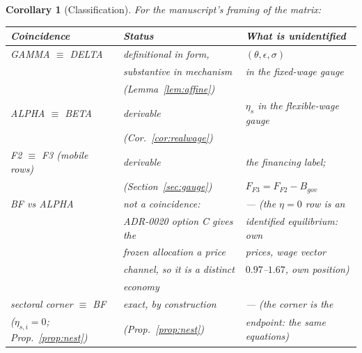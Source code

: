 \documentclass[11pt]{article}
\newtheorem{corollary}{Corollary}
\numberwithin{equation}{section}
\begin{document}
\begin{corollary}[Classification]\label{cor:class}
For the manuscript's framing of the matrix:

\begin{center}
\begin{tabular}{lll}
\toprule
Coincidence & Status & What is unidentified \\
\midrule
GAMMA $\equiv$ DELTA & definitional in form, & $(\theta,\epsilon,\sigma)$ \\
 & substantive in mechanism & in the fixed-wage gauge \\
 & (Lemma~\ref{lem:affine}) & \\
ALPHA $\equiv$ BETA & derivable & $\eta_s$ in the flexible-wage gauge \\
 & (Cor.~\ref{cor:realwage}) & \\
F2 $\equiv$ F3 (mobile rows) & derivable & the financing label; \\
 & (Section~\ref{sec:gauge}) & $F_{F3} = F_{F2} - B_{gov}$ \\
\textcolor{revisionV1}{BF vs ALPHA} & \textcolor{revisionV1}{not a coincidence:} & \textcolor{revisionV1}{--- (the $\eta=0$ row is an} \\
 & \textcolor{revisionV1}{ADR-0020 option C gives the} & \textcolor{revisionV1}{identified equilibrium: own} \\
 & \textcolor{revisionV1}{frozen allocation a price} & \textcolor{revisionV1}{prices, wage vector} \\
 & \textcolor{revisionV1}{channel, so it is a distinct} & \textcolor{revisionV1}{$0.97$--$1.67$, own position)} \\
 & \textcolor{revisionV1}{economy} & \\
\textcolor{revisionV2}{sectoral corner $\equiv$ BF} & \textcolor{revisionV2}{exact, by construction} & \textcolor{revisionV2}{--- (the corner \emph{is} the} \\
\textcolor{revisionV2}{($\eta_{s,i} = 0$; Prop.~\ref{prop:nest})} & \textcolor{revisionV2}{(Prop.~\ref{prop:nest})} & \textcolor{revisionV2}{endpoint: the same equations)} \\
\bottomrule
\end{tabular}
\end{center}


\end{corollary}
\end{document}
